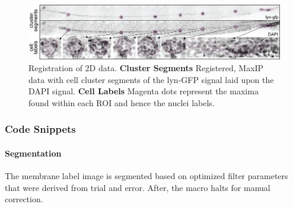 \documentclass[11pt,singlespacinge,twoside]{reedthesis} %
\theoremstyle{definition}
\theoremstyle{definition}
\theoremstyle{definition}
\theoremstyle{remark}
\begin{document}
\begin{figure}[h]

{\centering \includegraphics[width=0.95\linewidth,]{figures/materials/ground_truth/clusters/clusters} 

}

\caption[Registration of 2D data]{Registration of 2D data. \textbf{Cluster Segments} Registered, MaxIP data with cell cluster segments of the lyn-GFP signal laid upon the DAPI signal. \textbf{Cell Labels} Magenta dots represent the maxima found within each ROI and hence the nuclei labels.}\label{fig:maxllreg}
\end{figure}
\hypertarget{code-snippets}{%
\subsubsection{Code Snippets}\label{code-snippets}}

\hypertarget{segmentation}{%
\paragraph{Segmentation}\label{segmentation}}

The membrane label image is segmented based on optimized filter parameters that were derived from trial and error. After, the macro halts for manual correction.
\end{document}
